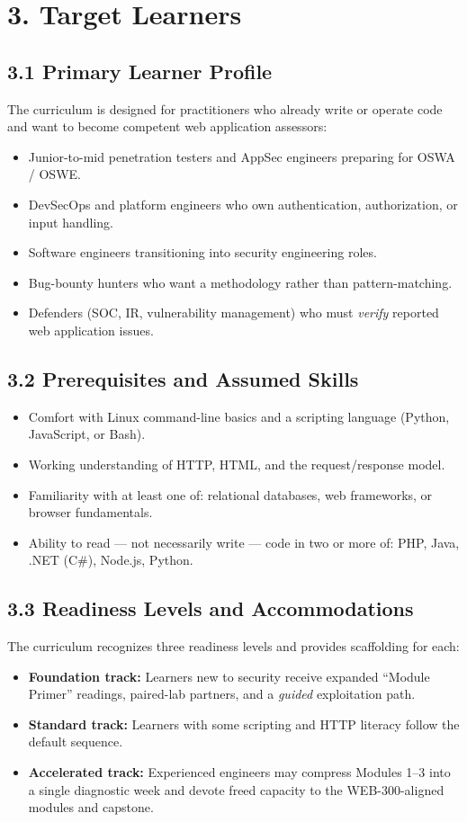 \documentclass[11pt,letterpaper,oneside]{report}
\begin{document}
\section*{3. Target Learners}

\subsection*{3.1 Primary Learner Profile}
The curriculum is designed for practitioners who already write or operate code and want to become competent web application assessors:
\begin{itemize}
  \item Junior-to-mid penetration testers and AppSec engineers preparing for OSWA / OSWE.
  \item DevSecOps and platform engineers who own authentication, authorization, or input handling.
  \item Software engineers transitioning into security engineering roles.
  \item Bug-bounty hunters who want a methodology rather than pattern-matching.
  \item Defenders (SOC, IR, vulnerability management) who must \emph{verify} reported web application issues.
\end{itemize}

\subsection*{3.2 Prerequisites and Assumed Skills}
\begin{itemize}
  \item Comfort with Linux command-line basics and a scripting language (Python, JavaScript, or Bash).
  \item Working understanding of HTTP, HTML, and the request/response model.
  \item Familiarity with at least one of: relational databases, web frameworks, or browser fundamentals.
  \item Ability to read --- not necessarily write --- code in two or more of: PHP, Java, .NET (C\#), Node.js, Python.
\end{itemize}

\subsection*{3.3 Readiness Levels and Accommodations}
The curriculum recognizes three readiness levels and provides scaffolding for each:
\begin{itemize}
  \item \textbf{Foundation track:} Learners new to security receive expanded ``Module Primer'' readings, paired-lab partners, and a \emph{guided} exploitation path.
  \item \textbf{Standard track:} Learners with some scripting and HTTP literacy follow the default sequence.
  \item \textbf{Accelerated track:} Experienced engineers may compress Modules 1--3 into a single diagnostic week and devote freed capacity to the WEB-300-aligned modules and capstone.
\end{itemize}
\end{document}
